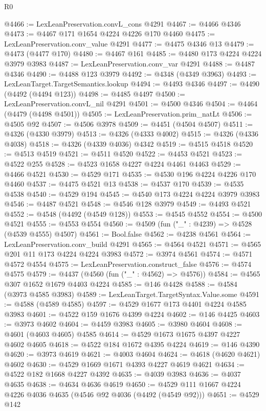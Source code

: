 \begin{lexlean}{R0}
\begin{coremodule}
@4466 := LexLeanPreservation.convL_cons @4291
@4467 := @4466 @4346
@4473 := @4467 @171 @1654 @4224 @4226 @170 @4460
@4475 := LexLeanPreservation.conv_value @4291
@4477 := @4475 @4346 @13
@4479 := @4473 (@4477 @170)
@4480 := @4467 @161
@4485 := @4480 @173 @4224 @4224 @3979 @3983
@4487 := LexLeanPreservation.conv_var @4291
@4488 := @4487 @4346
@4490 := @4488 @123 @3979
@4492 := @4348 (@4349 @3963)
@4493 := LexLeanTarget.TargetSemantics.lookup
@4494 := @4493 @4346
@4497 := @4490 (@4492 (@4494 @123))
@4498 := @4485 @4497
@4500 := LexLeanPreservation.convL_nil @4291
@4501 := @4500 @4346
@4504 := @4464 (@4479 (@4498 @4501))
@4505 := LexLeanPreservation.prim_natLt
@4506 := @4505 @92
@4507 := @4506 @3978
@4509 := @4451 (@4504 @4507)
@4511 := @4326 (@4330 @3979)
@4513 := @4326 (@4333 @4002)
@4515 := @4326 (@4336 @4038)
@4518 := @4326 (@4339 @4036) @4342
@4519 := @4515 @4518
@4520 := @4513 @4519
@4521 := @4511 @4520
@4522 := @4453 @4521
@4523 := @4522 @255
@4528 := @4523 @1658 @4227 @4224 @4461 @4463
@4529 := @4466 @4521
@4530 := @4529 @171
@4535 := @4530 @196 @4224 @4226 @170 @4460
@4537 := @4475 @4521 @13
@4538 := @4537 @170
@4539 := @4535 @4538
@4540 := @4529 @194
@4545 := @4540 @173 @4224 @4224 @3979 @3983
@4546 := @4487 @4521
@4548 := @4546 @128 @3979
@4549 := @4493 @4521
@4552 := @4548 (@4492 (@4549 @128))
@4553 := @4545 @4552
@4554 := @4500 @4521
@4555 := @4553 @4554
@4560 := @4509 (fun ("_" : @4239) => @4528 (@4539 @4555) @4507)
@4561 := Bool.false
@4562 := @4238 @4561
@4564 := LexLeanPreservation.conv_build @4291
@4565 := @4564 @4521
@4571 := @4565 @201 @11 @173 @4224 @4224 @3983
@4572 := @3974 @4561
@4574 := @4571 @4572 @4554
@4575 := LexLeanPreservation.construct_false
@4576 := @4574 @4575
@4579 := @4437 (@4560 (fun ("_" : @4562) => @4576))
@4584 := @4565 @307 @1652 @1679 @4403 @4224
@4585 := @146 @4428
@4588 := @4584 (@3973 @4585 @3983)
@4589 := LexLeanTarget.TargetSyntax.Value.some
@4591 := @4588 (@4589 @4585)
@4597 := @4529 @1677 @173 @4401 @4224 @4585 @3983
@4601 := @4522 @159 @1676 @4399 @4224
@4602 := @146 @4425
@4603 := @3973 @4602
@4604 := @4459 @3983
@4605 := @3980 @4604
@4608 := @4601 (@4603 @4605) @4585
@4614 := @4529 @1673 @1675 @4397 @4227 @4602 @4605
@4618 := @4522 @184 @1672 @4395 @4224
@4619 := @146 @4390
@4620 := @3973 @4619
@4621 := @4003 @4604
@4624 := @4618 (@4620 @4621) @4602
@4630 := @4529 @1669 @1671 @4393 @4227 @4619 @4621
@4634 := @4522 @182 @1668 @4227 @4392
@4635 := @4039 @3983
@4636 := @4037 @4635
@4638 := @4634 @4636 @4619
@4650 := @4529 @111 @1667 @4224 @4226 @4036 @4635 (@4546 @92 @4036 (@4492 (@4549 @92)))
@4651 := @4529 @142

\end{coremodule}
\end{lexlean}

